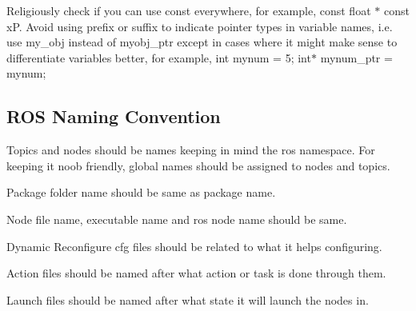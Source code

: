 Religiously check if you can use const everywhere, for example, {\ttfamily const float $\ast$ const xP}. Avoid using prefix or suffix to indicate pointer types in variable names, i.\+e. use {\ttfamily my\+\_\+obj} instead of {\ttfamily myobj\+\_\+ptr} except in cases where it might make sense to differentiate variables better, for example, {\ttfamily int mynum = 5; int$\ast$ mynum\+\_\+ptr = mynum;}\hypertarget{md_coding_docs_coding_guidelines_autotoc_md13}{}\subsection{R\+O\+S Naming Convention}\label{md_coding_docs_coding_guidelines_autotoc_md13}

\begin{DoxyItemize}
\item Topics and nodes should be names keeping in mind the {\ttfamily ros namespace}. For keeping it noob friendly, global names should be assigned to nodes and topics.
\item Package folder name should be same as package name.
\item Node file name, executable name and ros node name should be same.
\item Dynamic Reconfigure cfg files should be related to what it helps configuring.
\item Action files should be named after what action or task is done through them.
\item Launch files should be named after what state it will launch the nodes in.
\end{DoxyItemize}



 